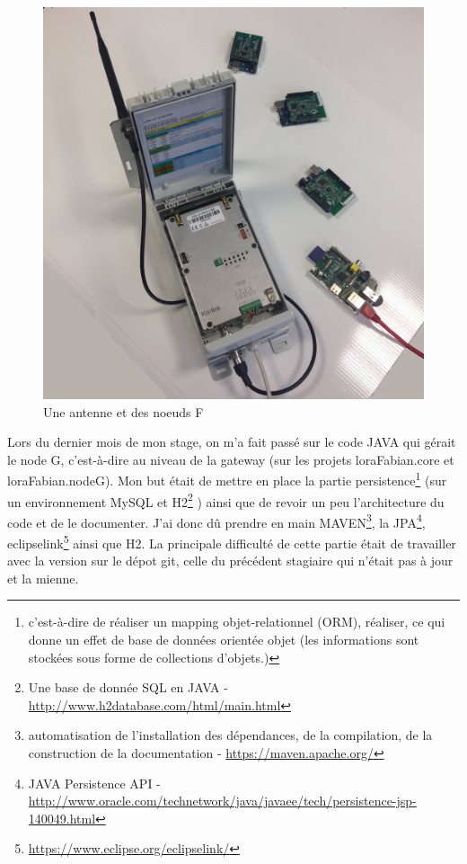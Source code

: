 \documentclass{article}
\begin{document}
\begin{figure}[h]
	\begin{center}
		\includegraphics[scale=0.09]{../res/img/antennaNodeF}
		\caption{Une antenne et des noeuds F}
		\label{fig:matoslora}
	\end{center}
\end{figure}

Lors du dernier mois de mon stage, on m’a fait passé sur le code JAVA qui gérait le node G, c’est-à-dire au niveau de la gateway (sur les projets loraFabian.core et loraFabian.nodeG). Mon but était de mettre en place la partie persistence\footnote{c'est-à-dire de réaliser un mapping objet-relationnel (ORM), réaliser, ce qui donne un effet de base de données orientée objet (les informations sont stockées sous forme de collections d'objets.)} (sur un environnement MySQL et H2\footnote{Une base de donnée SQL en JAVA - \url{http://www.h2database.com/html/main.html}} ) ainsi que de revoir un peu l’architecture du code et de le documenter. J’ai donc dû prendre en main MAVEN\footnote{automatisation de l'installation des dépendances, de la compilation, de la construction de la documentation - \url{https://maven.apache.org/}}, la JPA\footnote{JAVA Persistence API - \url{http://www.oracle.com/technetwork/java/javaee/tech/persistence-jsp-140049.html}}, eclipselink\footnote{\url{https://www.eclipse.org/eclipselink/}} ainsi que H2. La principale difficulté de cette partie était de travailler avec la version sur le dépot git, celle du précédent stagiaire qui n’était pas à jour et la mienne.
\end{document}
